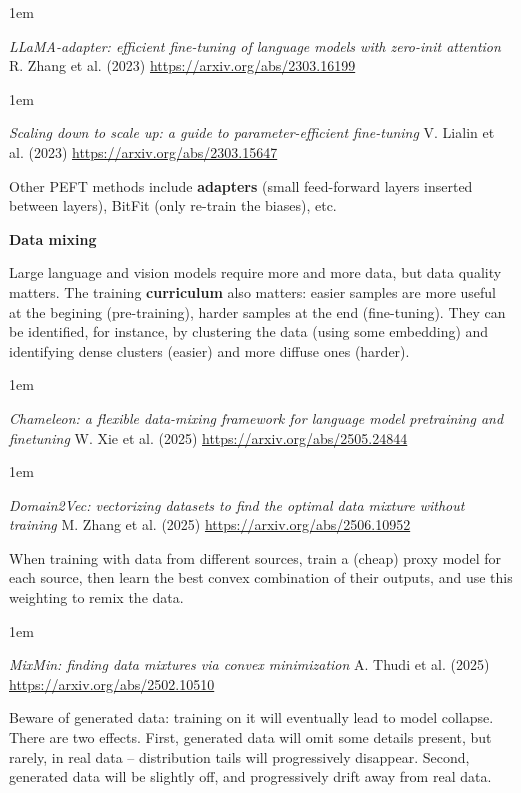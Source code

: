 \documentclass[a5paper]{article}
\let\d\textbf
\newenvironment{reference}{%
  \medskip\goodbreak
  \parskip 0pt
  \raggedright
  \leftskip 1em
  \obeylines
}{\par\medskip\goodbreak}
\def\subsection#1{{\par\bigskip\goodbreak\large\bfseries #1\par}}
\begin{document}
\begin{reference}
  \emph{LLaMA-adapter: efficient fine-tuning of language models with zero-init attention}
  R. Zhang et al. (2023)
  \url{https://arxiv.org/abs/2303.16199}
\end{reference}

\begin{reference}
  \emph{Scaling down to scale up:  a guide to parameter-efficient fine-tuning}
  V. Lialin et al. (2023)
  \url{https://arxiv.org/abs/2303.15647}
\end{reference}

Other PEFT methods include
\d{adapters} (small feed-forward layers inserted between layers),
BitFit (only re-train the biases),
etc.

\subsection{Data mixing}

Large language and vision models require more and more data,
but data quality matters.
The training \d{curriculum} also matters: easier samples are more useful at the begining (pre-training),
harder samples at the end (fine-tuning). They can be identified, for instance, by clustering the data
(using some embedding) and identifying dense clusters (easier) and more diffuse ones (harder).

\begin{reference}
  \emph{Chameleon: a flexible data-mixing framework for language model pretraining and finetuning}
  W. Xie et al. (2025)
  \url{https://arxiv.org/abs/2505.24844}
\end{reference}

\begin{reference}
  \emph{Domain2Vec: vectorizing datasets to find  the optimal data mixture without training}
  M. Zhang et al. (2025)
  \url{https://arxiv.org/abs/2506.10952}
\end{reference}

When training with data from different sources,
train a (cheap) proxy model for each source,
then learn the best convex combination of their outputs,
and use this weighting to remix the data.

\begin{reference}
  \emph{MixMin: finding data mixtures  via convex minimization}
  A. Thudi et al. (2025)
  \url{https://arxiv.org/abs/2502.10510}
\end{reference}

Beware of generated data: training on it will eventually lead to model collapse.
There are two effects. First, generated data will omit some details present, but rarely, in real data --
distribution tails will progressively disappear.
Second, generated data will be slightly off, and progressively drift away from real data.
\end{document}
